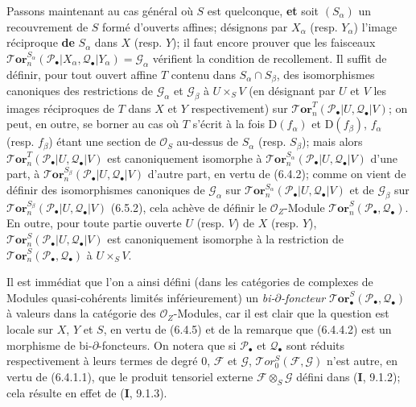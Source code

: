 \begin{env}[6.5.3]
Passons maintenant au cas général où $S$ est quelconque, \textbf{et} soit $(S_\alpha)$
un recouvrement de $S$ formé d'ouverts affines; désignons par $X_\alpha$
(resp. $Y_\alpha$) l'image réciproque \textbf{de} $S_\alpha$ dans $X$ (resp. $Y$); il
faut encore prouver que les faisceaux
$\boldsymbol{\mathscr{T}\!or}_n^{S_\alpha}
  (\mathscr P_\bullet|X_\alpha,\mathscr Q_\bullet|Y_\alpha)
  =\mathscr G_\alpha$
vérifient la condition de recollement. Il suffit de définir, pour tout ouvert
affine $T$ contenu dans $S_\alpha\cap S_\beta$, des isomorphismes canoniques des
restrictions de $\mathscr G_\alpha$ et $\mathscr G_\beta$ à $U\times_S V$ (en
désignant par $U$ et $V$ les images réciproques de $T$ dans $X$ et $Y$
respectivement) sur
$\boldsymbol{\mathscr{T}\!or}_n^T(\mathscr P_\bullet|U,\mathscr Q_\bullet|V)$; on peut, en
outre, se borner au cas où $T$ s'écrit à la fois $\mathrm D(f_\alpha)$ et
$\mathrm D(f_\beta)$, $f_\alpha$ (resp. $f_\beta$) étant une section de
$\mathscr O_S$ au-dessus de $S_\alpha$ (resp. $S_\beta$); mais alors
$\boldsymbol{\mathscr{T}\!or}_n^T(\mathscr P_\bullet|U,\mathscr Q_\bullet|V)$ est
canoniquement isomorphe à
$\boldsymbol{\mathscr{T}\!or}_n^{S_\alpha}(\mathscr P_\bullet|U,\mathscr Q_\bullet|V)$
d'une part, à
$\boldsymbol{\mathscr{T}\!or}_n^{S_\beta}(\mathscr P_\bullet|U,\mathscr Q_\bullet|V)$
d'autre part, en vertu de (6.4.2); comme on vient de définir des isomorphismes
canoniques de $\mathscr G_\alpha$ sur
$\boldsymbol{\mathscr{T}\!or}_n^{S_\alpha}(\mathscr P_\bullet|U,\mathscr Q_\bullet|V)$ et
de $\mathscr G_\beta$ sur
$\boldsymbol{\mathscr{T}\!or}_n^{S_\beta}(\mathscr P_\bullet|U,\mathscr Q_\bullet|V)$
(6.5.2), cela achève de définir le $\mathscr O_Z$-Module
$\boldsymbol{\mathscr{T}\!or}_n^S(\mathscr P_\bullet,\mathscr Q_\bullet)$. En outre, pour
toute partie ouverte $U$ (resp. $V$) de $X$ (resp. $Y$),
$\boldsymbol{\mathscr{T}\!or}_n^S(\mathscr P_\bullet|U,\mathscr Q_\bullet|V)$ est
canoniquement isomorphe à la restriction de
$\boldsymbol{\mathscr{T}\!or}_n^S(\mathscr P_\bullet,\mathscr Q_\bullet)$ à $U\times_S V$.

Il est immédiat que l'on a ainsi défini (dans les catégories de complexes de
Modules quasi-cohérents limités inférieurement) un \emph{bi-$\partial$-foncteur}
$\boldsymbol{\mathscr{T}\!or}_\bullet^S(\mathscr P_\bullet,\mathscr Q_\bullet)$ à valeurs
dans la catégorie des $\mathscr O_Z$-Modules, car il est clair que la question
est locale sur $X$, $Y$ et $S$, en vertu de (6.4.5) et de la remarque que
(6.4.4.2) est un morphisme de bi-$\partial$-foncteurs. On notera que si
$\mathscr P_\bullet$ et $\mathscr Q_\bullet$ sont réduits respectivement à
leurs termes de degré 0, $\mathscr F$ et $\mathscr G$,
$\mathscr{T}\!or_0^S(\mathscr F,\mathscr G)$ n'est autre, en vertu de
(6.4.1.1), que le produit tensoriel externe $\mathscr F\otimes_S\mathscr G$
défini dans (\textbf{I}, 9.1.2); cela résulte en effet de (\textbf{I}, 9.1.3).
\end{env}


